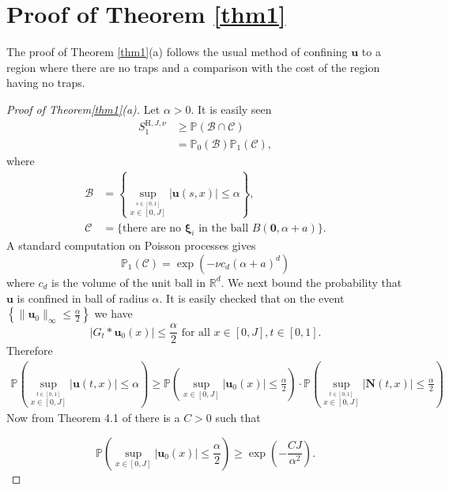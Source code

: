 \documentclass[12pt]{amsart}
\numberwithin{equation}{section}
\theoremstyle{definition}
\numberwithin{equation}{section}
\newcommand{\be}{\begin{equation}}
\newcommand{\ee}{\end{equation}}
\newcommand{\mP}{\mathbb{P}}
\newcommand{\R}{\mathbb{R}}
\newcommand{\HH}{\text{H}}
\newcommand{\N}{\mathbf{N}}
\newcommand{\uv}{\mathbf u}
\begin{document}
 
\section{Proof of Theorem \ref{thm1}} \label{sec:thm1}


The proof of Theorem \ref{thm1}(a) follows  the usual method of confining $\uv$ to a region where there are no traps and a comparison with the cost of the region having no traps.

\begin{proof}[Proof of Theorem\ref{thm1}(a)]
  
Let $\alpha >0$. It is easily seen
\begin{equation}\label{eq:st1n} \begin{split} S_1^{\HH, J,\nu} 
&\ge \mP(\mathcal B\cap \mathcal C) \\
&= \mP_0(\mathcal B) \mP_1(\mathcal C),
\end{split}\end{equation}
where 
\begin{align*}
\mathcal B &= \left\{\sup_{\stackrel{s\in [0,1]}{x\in [0,J]}}\left|\uv(s,x)\right|\le \alpha\right\},\\
\mathcal C &= \Big\{\text{there are no }\boldsymbol{\xi}_i \text{ in the ball } B\left(\mathbf{0},\alpha+a\right)\Big\}.
\end{align*}
A standard  computation on Poisson processes gives
\be \label{eq:ct} \mP_1(\mathcal C) = \exp\left(-\nu c_d (\alpha+a)^d\right)\ee
where $c_d$ is the volume of the unit ball in $\R^d$.   We next  bound the probability that $\uv$ is confined in ball of radius $\alpha$.
It is easily checked that on the event $\left\{ \|\uv_0\|_{\infty}\le \frac{\alpha}{2}\right\}$ we have
\[ \left|G_t*\uv_0(x)\right|\le \frac{\alpha}{2} \text{ for all } x \in [0,J], t \in [0,1].\]
Therefore 
\begin{align*}
\mP\left(\sup_{\stackrel{t\in [0,1]}{x\in [0,J]}} |\uv(t,x)|\le \alpha\right) \ge \mP\left(\sup_{x\in [0,J]} |\uv_0(x)|\le \frac{\alpha}{2}\right) \cdot \mP\left(\sup_{\stackrel{t\in [0,1]}{x\in [0,J]}} \left| \N(t,x)\right| \le \frac{\alpha}{2}\right)
\end{align*}
Now from Theorem 4.1 of \cite{LS} there is a $C>0$ such that

$$
\mP\left(\sup_{x\in [0,J]} |\uv_0(x)|\le \frac{\alpha}{2}\right) \geq \exp(-\frac{CJ}{\alpha^2}).
$$


\end{proof}
\end{document}
